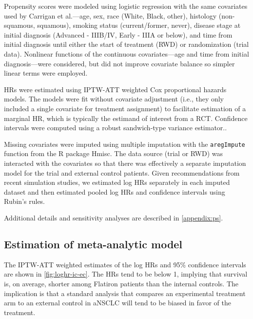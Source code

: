 \documentclass[11pt,final,fleqn]{article}\usepackage[]{graphicx}\usepackage[]{color}
\newcommand{\pkg}[1]{{\fontseries{m}\fontseries{b}\selectfont #1}}
\begin{document}
Propensity scores were modeled using logistic regression with the same covariates used by Carrigan et al.\cite{carrigan2020using}---age, sex, race (White, Black, other), histology (non-squamous, squamous), smoking status (current/former, never), disease stage at initial diagnosis (Advanced - IIIB/IV, Early - IIIA or below), and time from initial diagnosis until either the start of treatment (RWD) or randomization (trial data). Nonlinear functions of the continuous covariates---age and time from initial diagnosis---were considered, but did not improve covariate balance so simpler linear terms were employed.

HRs were estimated using IPTW-ATT weighted Cox proportional hazards models. The models were fit without covariate adjustment (i.e., they only included a single covariate for treatment assignment) to facilitate estimation of a marginal HR,\cite{daniel2021making} which is typically the estimand of interest from a RCT. Confidence intervals were computed using a robust sandwich-type variance estimator.\cite{austin2014use}. 

Missing covariates were imputed using multiple imputation with the \texttt{aregImpute} function from the \textsf{R}  package \pkg{Hmisc}.\cite{Hmisc2021} The data source (trial or RWD) was interacted with the covariates so that there was effectively a separate imputation model for the trial and external control patients. Given recommendations from recent simulation studies, we estimated log HRs separately in each imputed dataset and then estimated pooled log HRs and confidence intervals using Rubin's rules.\cite{leyrat2019propensity,granger2019avoiding}

Additional details and sensitivity analyses are described in \autoref{appendix:ps}.

\subsection{Estimation of meta-analytic model}
The IPTW-ATT weighted estimates of the log HRs and 95\% confidence intervals are shown in \autoref{fig:loghr-ic-ec}. The HRs tend to be below 1, implying that survival is, on average, shorter among Flatiron patients than the internal controls. The implication is that a standard analysis that compares an experimental treatment arm to an external control in aNSCLC will tend to be biased in favor of the treatment.
\end{document}
